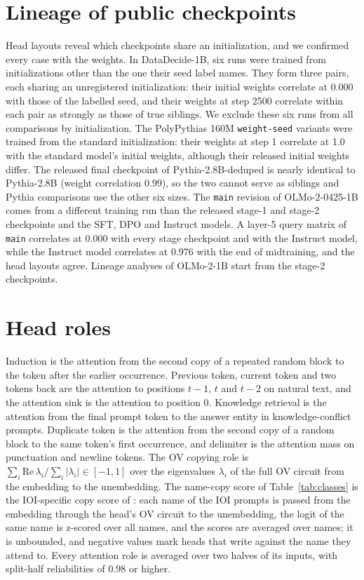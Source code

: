 \documentclass[11pt]{article}
\begin{document}
\appendix

\section{Lineage of public checkpoints}
\label{app:audit}
Head layouts reveal which checkpoints share an initialization, and we confirmed every case with the weights.
In DataDecide-1B, six runs were trained from initializations other than the one their seed label names.
They form three pairs, each sharing an unregistered initialization: their initial weights correlate at 0.000 with those of the labelled seed, and their weights at step 2500 correlate within each pair as strongly as those of true siblings.
We exclude these six runs from all comparisons by initialization.
The PolyPythias 160M \texttt{weight-seed} variants were trained from the standard initialization: their weights at step 1 correlate at 1.0 with the standard model's initial weights, although their released initial weights differ.
The released final checkpoint of Pythia-2.8B-deduped is nearly identical to Pythia-2.8B (weight correlation 0.99), so the two cannot serve as siblings and Pythia comparisons use the other six sizes.
The \texttt{main} revision of OLMo-2-0425-1B comes from a different training run than the released stage-1 and stage-2 checkpoints and the SFT, DPO and Instruct models.
A layer-5 query matrix of \texttt{main} correlates at 0.000 with every stage checkpoint and with the Instruct model, while the Instruct model correlates at 0.976 with the end of midtraining, and the head layouts agree.
Lineage analyses of OLMo-2-1B start from the stage-2 checkpoints.

\section{Head roles}
\label{app:roles}
Induction is the attention from the second copy of a repeated random block to the token after the earlier occurrence.
Previous token, current token and two tokens back are the attention to positions $t-1$, $t$ and $t-2$ on natural text, and the attention sink is the attention to position 0.
Knowledge retrieval is the attention from the final prompt token to the answer entity in knowledge-conflict prompts.
Duplicate token is the attention from the second copy of a random block to the same token's first occurrence, and delimiter is the attention mass on punctuation and newline tokens.
The OV copying role is $\sum_i \mathrm{Re}\,\lambda_i / \sum_i |\lambda_i| \in [-1, 1]$ over the eigenvalues $\lambda_i$ of the full OV circuit from the embedding to the unembedding.
The name-copy score of Table~\ref{tab:classes} is the IOI-specific copy score of \citet{wang2023interpretability}: each name of the IOI prompts is passed from the embedding through the head's OV circuit to the unembedding, the logit of the same name is z-scored over all names, and the scores are averaged over names; it is unbounded, and negative values mark heads that write against the name they attend to.
Every attention role is averaged over two halves of its inputs, with split-half reliabilities of 0.98 or higher.
\end{document}
